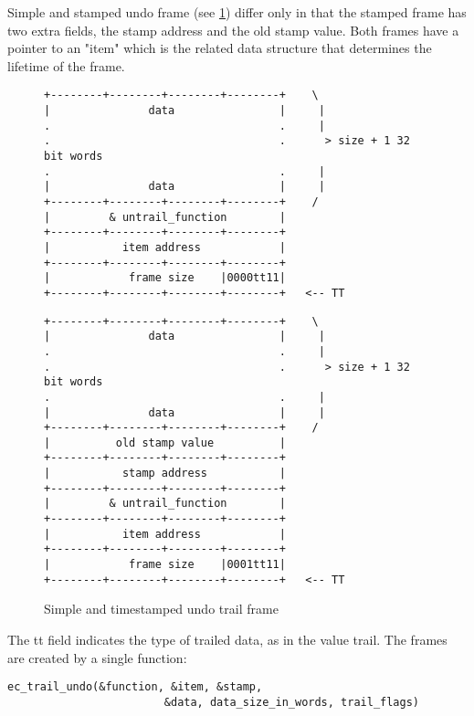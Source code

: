 Simple and stamped undo frame
(see \ref{figundotrail})
differ only in that the stamped frame has two extra fields, the stamp
address and the old stamp value.
Both frames have a pointer to an "item" which is the related data
structure that determines the lifetime of the frame.
\begin{figure}
\hfill
\begin{minipage}[t]{.45\textwidth}
\begin{tiny}
\begin{verbatim}
+--------+--------+--------+--------+    \
|               data                |     |
.                                   .     |
.                                   .      > size + 1 32 bit words
.                                   .     |
|               data                |     |
+--------+--------+--------+--------+    /
|         & untrail_function        |
+--------+--------+--------+--------+
|           item address            |
+--------+--------+--------+--------+
|            frame size    |0000tt11|
+--------+--------+--------+--------+   <-- TT
\end{verbatim}
\end{tiny}
\end{minipage}
\hfill
\begin{minipage}[t]{.45\textwidth}
\begin{tiny}
\begin{verbatim}
+--------+--------+--------+--------+    \
|               data                |     |
.                                   .     |
.                                   .      > size + 1 32 bit words
.                                   .     |
|               data                |     |
+--------+--------+--------+--------+    /
|          old stamp value          |
+--------+--------+--------+--------+
|           stamp address           |
+--------+--------+--------+--------+
|         & untrail_function        |
+--------+--------+--------+--------+
|           item address            |
+--------+--------+--------+--------+
|            frame size    |0001tt11|
+--------+--------+--------+--------+   <-- TT
\end{verbatim}
\end{tiny}
\end{minipage}
\hfill
\caption{Simple and timestamped undo trail frame}
\label{figundotrail}
\end{figure}
The tt field indicates the type of trailed data, as in the value trail.
The frames are created by a single function:
\begin{verbatim}
ec_trail_undo(&function, &item, &stamp,
                        &data, data_size_in_words, trail_flags)
\end{verbatim}
